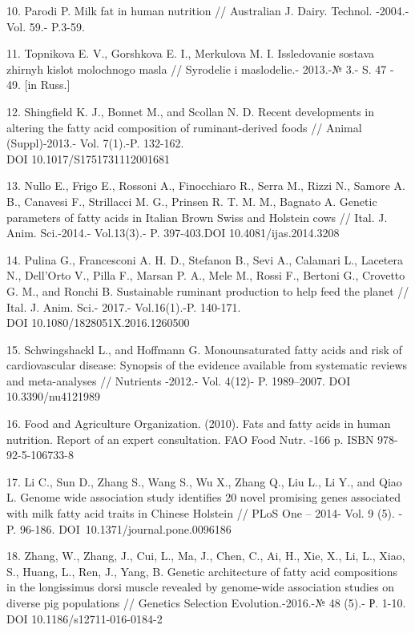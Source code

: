\begin{noparindent}
10. Parodi P. Milk fat in human nutrition // Australian J. Dairy.
Technol. -2004.-Vol. 59.- P.3-59.

11. Topnikova E. V., Gorshkova E. I., Merkulova M. I. Issledovanie
sostava zhirnyh kislot molochnogo masla // Syrodelie i maslodelie.-
2013.-№ 3.- S. 47 - 49. {[}in Russ.{]}

12. Shingfield K. J., Bonnet M., and Scollan N. D. Recent developments
in altering the fatty acid composition of ruminant-derived foods //
Animal (Suppl)-2013.- Vol. 7(1).-P. 132-162. \\DOI 10.1017/S1751731112001681

13. Nullo E., Frigo E., Rossoni A., Finocchiaro R., Serra M., Rizzi N.,
Samore A. B., Canavesi F., Strillacci M. G., Prinsen R. T. M. M.,
Bagnato A. Genetic parameters of fatty acids in Italian Brown Swiss and
Holstein cows // Ital. J. Anim. Sci.-2014.- Vol.13(3).- P. 397-403.DOI 10.4081/ijas.2014.3208

14. Pulina G., Francesconi A. H. D., Stefanon B., Sevi A., Calamari L.,
Lacetera N., Dell'Orto V., Pilla F., Marsan P. A., Mele M., Rossi F.,
Bertoni G., Crovetto G. M., and Ronchi B. Sustainable ruminant
production to help feed the planet // Ital. J. Anim. Sci.- 2017.-
Vol.16(1).-P. 140-171. \\DOI 10.1080/1828051X.2016.1260500

15. Schwingshackl L., and Hoffmann G. Monounsaturated fatty acids and
risk of cardiovascular disease: Synopsis of the evidence available from
systematic reviews and meta-analyses // Nutrients -2012.- Vol. 4(12)- P.
1989--2007. DOI 10.3390/nu4121989

16. Food and Agriculture Organization. (2010). Fats and fatty acids in
human nutrition. Report of an expert consultation. FAO Food Nutr. -166
p. ISBN 978-92-5-106733-8

17. Li C., Sun D., Zhang S., Wang S., Wu X., Zhang Q., Liu L., Li Y.,
and Qiao L. Genome wide association study identifies 20 novel promising
genes associated with milk fatty acid traits in Chinese Holstein // PLoS
One -- 2014- Vol. 9 (5). - P. 96-186. DOI~10.1371/journal.pone.0096186

18. Zhang, W., Zhang, J., Cui, L., Ma, J., Chen, C., Ai, H., Xie, X.,
Li, L., Xiao, S., Huang, L., Ren, J., Yang, B. Genetic architecture of
fatty acid compositions in the longissimus dorsi muscle revealed by
genome-wide association studies on diverse pig populations // Genetics
Selection Evolution.-2016.-№ 48 (5).- Р. 1-10. DOI
10.1186/s12711-016-0184-2


\end{noparindent}

